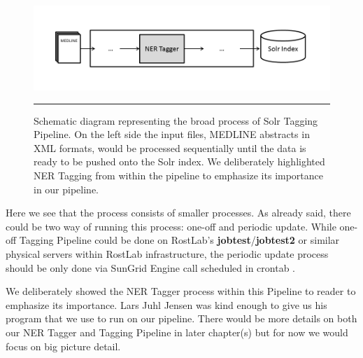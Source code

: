 \begin{figure}[htbp]
  \centering
    \includegraphics[width=6in]{Figures/solr_tagging_pipeline.png}
    \rule{35em}{0.5pt}
  \caption[Schematic representation of PubSeq Tagging Pipeline.]{Schematic diagram representing the broad process of Solr Tagging Pipeline. On the left side the input files, MEDLINE abstracts in XML formats, would be processed sequentially until the data is ready to be pushed onto the Solr index. We deliberately highlighted NER Tagging from within the pipeline to emphasize its importance in our pipeline.}
  \label{fig:TaggingPipelineBroad}
\end{figure}

Here we see that the process consists of smaller processes. As already said, there could be two way of running this process: one-off and periodic update. While one-off Tagging Pipeline could be done on RostLab's \textbf{jobtest}/\textbf{jobtest2} or similar physical servers within RostLab infrastructure, the periodic update process should be only done via SunGrid Engine call scheduled in crontab \citep{keller1999take}.

We deliberately showed the NER Tagger process within this Pipeline to reader to emphasize its importance. Lars Juhl Jensen was kind enough to give us his program that we use to run on our pipeline. There would be more details on both our NER Tagger and Tagging Pipeline in later chapter(s) but for now we would focus on big picture detail.